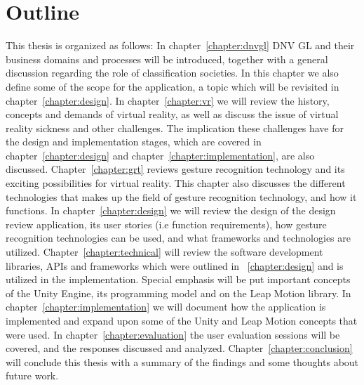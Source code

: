 \section{Outline}
This thesis is organized as follows: In chapter~\ref{chapter:dnvgl} DNV GL and their business domains and processes will be introduced, together with a general discussion regarding
the role of classification societies. In this chapter we also define some of the scope for the application, a topic which will be revisited in 
chapter~\ref{chapter:design}. In chapter~\ref{chapter:vr} we will review the history, concepts and demands of virtual reality, as well as discuss the issue of virtual reality
sickness and other challenges. The implication these challenges have for the design and implementation stages, which are covered in chapter~\ref{chapter:design} and
chapter~\ref{chapter:implementation}, are also discussed. Chapter~\ref{chapter:grt} reviews gesture recognition technology and its exciting possibilities for virtual reality.
This chapter also discusses the different technologies that makes up the field of gesture recognition technology, and how it functions. 
In chapter~\ref{chapter:design} we will review the design of the design review application, its user stories (i.e function requirements), how gesture recognition technologies
can be used, and what frameworks and technologies are utilized. Chapter~\ref{chapter:technical} will review the software development libraries, APIs and frameworks
which were outlined in ~\ref{chapter:design} and is utilized in the implementation. Special emphasis will be put important concepts of the Unity Engine, its programming model
and on the Leap Motion library.  
In chapter~\ref{chapter:implementation} we will document how the application is implemented and expand upon some of the Unity and Leap Motion concepts that were used.
In chapter~\ref{chapter:evaluation} the user evaluation sessions will be covered, and the responses discussed and analyzed.
Chapter~\ref{chapter:conclusion} will conclude this thesis with a summary of the findings and some thoughts about future work.


